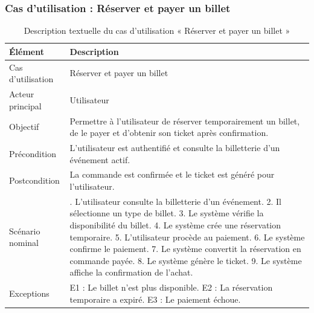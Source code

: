 \subsubsection{Cas d’utilisation : Réserver et payer un billet}


\begin{table}[H]
\centering
\caption{Description textuelle du cas d’utilisation « Réserver et payer un billet »}
\label{tableau:6-2}
\renewcommand{\arraystretch}{1.2}
\begin{tabularx}{\textwidth}{|>{\raggedright\arraybackslash}X|>{\raggedright\arraybackslash}X|}
\hline
\rowcolor[HTML]{ECF4FF}
\textbf{Élément} & \textbf{Description} \\
\hline
Cas d’utilisation & Réserver et payer un billet \\
\hline
Acteur principal & Utilisateur \\
\hline
Objectif & Permettre à l’utilisateur de réserver temporairement un billet, de le payer et d’obtenir son ticket après confirmation. \\
\hline
Précondition & L’utilisateur est authentifié et consulte la billetterie d’un événement actif. \\
\hline
Postcondition & La commande est confirmée et le ticket est généré pour l’utilisateur. \\
\hline
Scénario nominal & 1. L’utilisateur consulte la billetterie d’un événement.\newline{} 2. Il sélectionne un type de billet.\newline{} 3. Le système vérifie la disponibilité du billet.\newline{} 4. Le système crée une réservation temporaire.\newline{} 5. L’utilisateur procède au paiement.\newline{} 6. Le système confirme le paiement.\newline{} 7. Le système convertit la réservation en commande payée.\newline{} 8. Le système génère le ticket.\newline{} 9. Le système affiche la confirmation de l’achat. \\
\hline
Exceptions & E1 : Le billet n’est plus disponible.\newline{} E2 : La réservation temporaire a expiré.\newline{} E3 : Le paiement échoue. \\
\hline
\end{tabularx}
\end{table}


